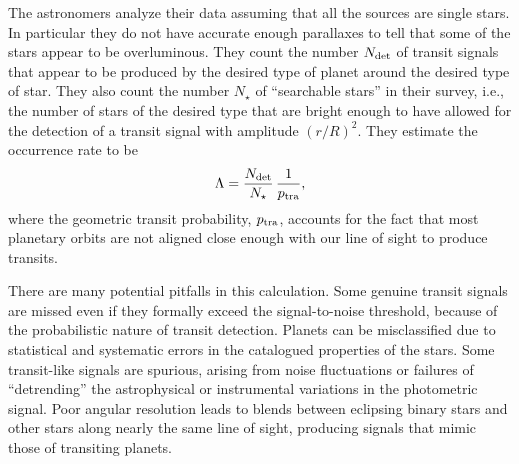 \documentclass[12pt,modern]{aastex61}
\begin{document}
The astronomers analyze their data assuming that all the sources are
single stars.  In particular they do not have accurate enough
parallaxes to tell that some of the stars appear to be overluminous.
They count the number $N_{\rm det}$ of transit signals that appear to
be produced by the desired type of planet around the desired type of
star.  They also count the number $N_\star$ of ``searchable stars'' in
their survey, i.e., the number of stars of the desired type that are
bright enough to have allowed for the detection of a transit signal
with amplitude $(r/R)^2$.  They estimate the occurrence rate to be
\begin{equation}
  \Lambda = \frac{N_{\rm det}}{N_\star}
                    \, \frac{1}{p_{\rm tra}},
  \label{eq:occ_rate_simple}
\end{equation}
where the geometric transit probability, $p_{\rm tra}$, accounts for
the fact that most planetary orbits are not aligned close enough with
our line of sight to produce transits.

There are many potential pitfalls in this calculation.  Some genuine
transit signals are missed even if they formally exceed the
signal-to-noise threshold, because of the probabilistic nature of
transit detection.  Planets can be misclassified due to statistical
and systematic errors in the catalogued properties of the stars.  Some
transit-like signals are spurious, arising from noise fluctuations or
failures of ``detrending'' the astrophysical or instrumental
variations in the photometric signal.  Poor angular resolution leads
to blends between eclipsing binary stars and other stars along nearly
the same line of sight, producing signals that mimic those of
transiting planets.
\end{document}
